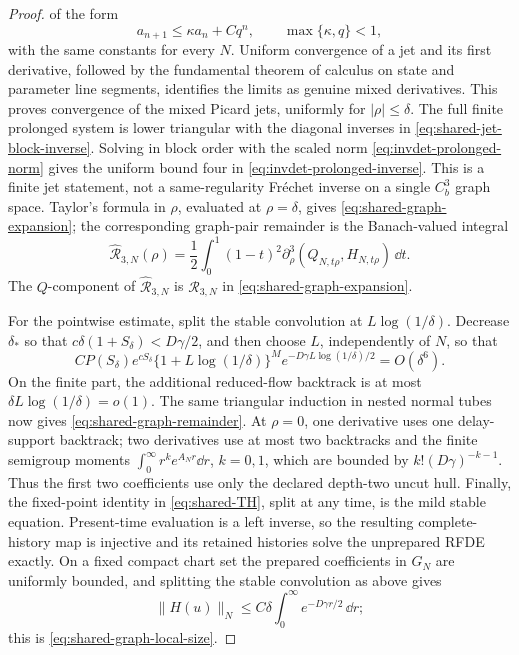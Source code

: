 \begin{proof}
of the form
\[
 a_{n+1}\le\kappa a_n+Cq^n,\qquad \max\{\kappa,q\}<1,
\]
with the same constants for every \(N\).  Uniform convergence of a jet and
its first derivative, followed by the fundamental theorem of calculus on
state and parameter line segments, identifies the limits as genuine mixed
derivatives.  This proves convergence of the mixed Picard jets, uniformly
for \(|\rho|\le\delta\).  The full finite prolonged system is lower
triangular with the diagonal inverses in
\cref{eq:shared-jet-block-inverse}.  Solving in block order with the scaled
norm \cref{eq:invdet-prolonged-norm} gives the uniform bound four in
\cref{eq:invdet-prolonged-inverse}.  This is a
finite jet statement, not a same-regularity Fr\'echet inverse on a single
\(C_b^3\) graph space.  Taylor's formula in \(\rho\), evaluated at
\(\rho=\delta\), gives
\cref{eq:shared-graph-expansion}; the corresponding graph-pair remainder is
the Banach-valued integral
\[
 \widehat{\mathcal R}_{3,N}(\rho)
 =\frac12\int_0^1(1-t)^2
       \partial_\rho^3(Q_{N,t\rho},H_{N,t\rho})\,\dd t.
\]
The \(Q\)-component of \(\widehat{\mathcal R}_{3,N}\) is
\(\mathcal R_{3,N}\) in \cref{eq:shared-graph-expansion}.

For the pointwise estimate, split the stable convolution at
\(L\log(1/\delta)\).  Decrease \(\delta_*\) so that
\(c\delta(1+S_\delta)<D\gamma/2\), and then choose \(L\), independently of
\(N\), so that
\begin{equation}
 CP(S_\delta)e^{cS_\delta}
 \{1+L\log(1/\delta)\}^M
 e^{-D\gamma L\log(1/\delta)/2}=O(\delta^6).          \label{eq:shared-convolution-tail}
\end{equation}
On the finite part, the additional reduced-flow backtrack is at most
\(\delta L\log(1/\delta)=o(1)\).  The same triangular induction in nested
normal tubes now gives \cref{eq:shared-graph-remainder}.  At
\(\rho=0\), one derivative uses one delay-support backtrack; two derivatives
use at most two backtracks and the finite semigroup moments
\(\int_0^\infty r^ke^{A_Nr}\dd r\), \(k=0,1\), which are bounded by
\(k!(D\gamma)^{-k-1}\).  Thus the first two coefficients use only the
declared depth-two uncut hull.  Finally,
the fixed-point identity in \cref{eq:shared-TH}, split at any time, is the
mild stable equation.  Present-time evaluation is a left inverse, so the
resulting complete-history map is injective and its retained histories solve
the unprepared RFDE exactly.  On a fixed compact chart set the prepared
coefficients in \(G_N\) are uniformly bounded, and splitting the stable
convolution as above gives
\[
 \|H(u)\|_N
 \le C\delta\int_0^\infty e^{-D\gamma r/2}\,\dd r;
\]
this is \cref{eq:shared-graph-local-size}.


\end{proof}
